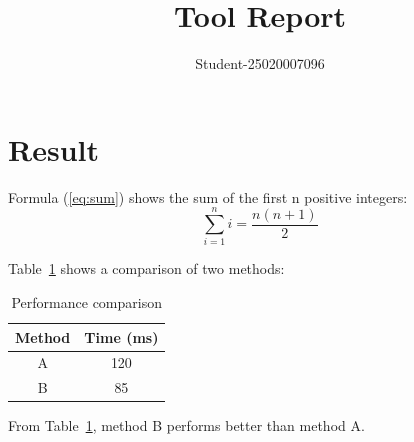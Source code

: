 \documentclass{article}
\begin{document}
\title{Tool Report}
\author{Student-25020007096}
\maketitle
\section{Result}

Formula (\ref{eq:sum}) shows the sum of the first n positive integers:
\begin{equation}
\label{eq:sum}
\sum_{i=1}^{n} i = \frac{n(n+1)}{2}
\end{equation}

Table~\ref{tab:perf} shows a comparison of two methods:
\begin{table}[h]
\centering
\begin{tabular}{|c|c|}
\hline
\textbf{Method} & \textbf{Time (ms)} \\
\hline
A & 120 \\
B & 85 \\
\hline
\end{tabular}
\caption{Performance comparison}
\label{tab:perf}
\end{table}

From Table~\ref{tab:perf}, method B performs better than method A.
\end{document}
